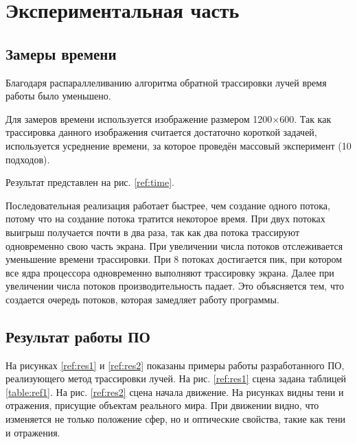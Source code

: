 \chapter{Экспериментальная часть}

\section{Замеры времени}

Благодаря распараллеливанию алгоритма обратной трассировки лучей
время работы было уменьшено.

Для замеров времени используется изображение размером 1200$\times$600.
Так как трассировка данного изображения считается достаточно короткой
задачей, используется усреднение времени, за которое проведён массовый эксперимент
(10 подходов).

Результат представлен на рис. \ref{ref:time}.

\begin{figure}[ht!]
\end{figure}

\newpage

Последовательная реализация работает быстрее, чем создание одного потока,
потому что на создание потока тратится некоторое время.
При двух потоках выигрыш получается почти в два раза, так как два потока
трассируют одновременно свою часть экрана.
При увеличении числа потоков отслеживается уменьшение времени трассировки.
При 8 потоках достигается пик, при котором все ядра процессора одновременно
выполняют трассировку экрана.
Далее при увеличении числа потоков производительность падает.
Это объясняется тем, что создается очередь потоков, которая замедляет
работу программы.

\section{Результат работы ПО}

На рисунках \ref{ref:res1} и \ref{ref:res2} показаны
примеры работы разработанного ПО, реализующего
метод трассировки лучей.
На рис. \ref{ref:res1} сцена задана таблицей \ref{table:ref1}.
На рис. \ref{ref:res2} сцена начала движение.
На рисунках видны тени и отражения, присущие объектам реального мира.
При движении видно, что изменяется не только положение сфер, но и оптические
свойства, такие как тени и отражения.


